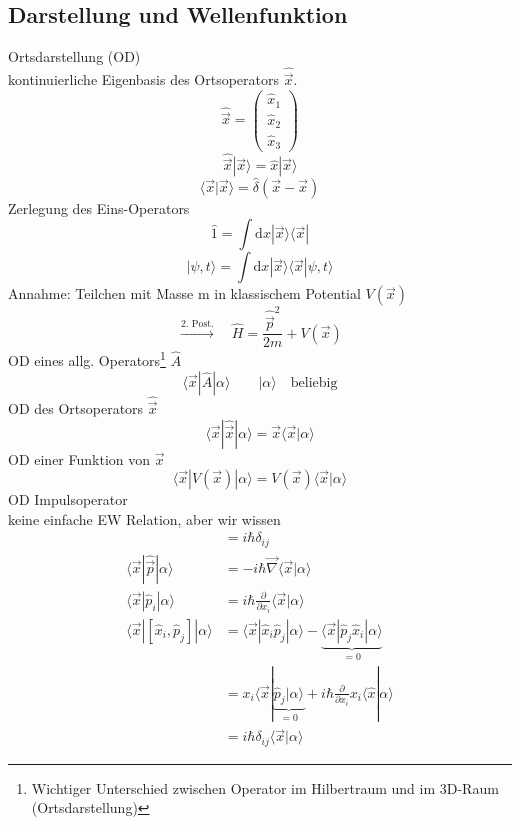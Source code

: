 \documentclass[10pt,article,colorback,accentcolor=tud9d]{scrartcl}
\begin{document}
\subsection{Darstellung und Wellenfunktion}
Ortsdarstellung (OD)\\
kontinuierliche Eigenbasis des Ortsoperators $\hat{\vec{x}}$.
$$
\hat{\vec{x}}=\left(\begin{array}{c} \hat{x}_1 \\ \hat{x}_2 \\ \hat{x}_3 \end{array}\right)
$$
$$
\hat{\vec{x}}|\vec{x}\rangle=\hat{x}|\vec{x}\rangle
$$
\begin{equation}
\langle\vec{x}|\vec{x}\rangle=\hat{\delta}(\vec{x}-\vec{x})
\end{equation}
Zerlegung des Eins-Operators
$$
\hat{1}=\int \text{d}x \left|\vec{x}\rangle\langle\vec{x}\right|
$$
\begin{equation}
|\psi,t\rangle=\int \text{d}x\left|\vec{x}\rangle\langle\vec{x}\right|\psi,t\rangle
\label{eq:WellenfunktionOrtsdarstellung}
\end{equation}
Annahme: Teilchen mit Masse m in klassischem Potential $V(\vec{x})$
\begin{equation}
\xrightarrow{\text{2. Post.}} \quad \hat{H}=\frac{\hat{\vec{p}}^2}{2m}+V(\vec{x})
\label{eq:Hamiltonoperator}
\end{equation}
OD eines allg. Operators\footnote{Wichtiger Unterschied zwischen Operator im Hilbertraum und im 3D-Raum (Ortsdarstellung)} $\hat{A}$
$$
\langle\vec{x}|\hat{A}|\alpha\rangle \quad \quad |\alpha\rangle \quad \text{beliebig}
$$
OD des Ortsoperators $\hat{\vec{x}}$
$$
\langle\vec{x}|\hat{\vec{x}}|\alpha\rangle=\vec{x}\langle\vec{x}|\alpha\rangle
$$
OD einer Funktion von $\vec{x}$
$$
\langle\vec{x}|V(\vec{x})|\alpha\rangle=V(\vec{x})\langle\vec{x}|\alpha\rangle
$$
OD Impulsoperator\\
keine einfache EW Relation, aber wir wissen
\begin{align}
  [\hat{x}_i,\hat{p}_j]&=i\hbar\delta_{ij} \\ 
  \langle\vec{x}|\hat{\vec{p}}|\alpha\rangle&=-i\hbar\vec{\nabla}\langle\vec{x}|\alpha\rangle\\ 
  \langle\vec{x}|\hat{p}_i|\alpha\rangle&=i\hbar\frac{\partial}{\partial x_i}\langle\vec{x}|\alpha\rangle\\
  \langle\vec{x}|[\hat{x}_i,\hat{p}_j]|\alpha\rangle&=\langle\vec{x}|\hat{x}_i\hat{p}_j|\alpha\rangle-\underbrace{\langle\vec{x}|\hat{p}_j\hat{x}_i|\alpha\rangle}_{=0}\\ 
  &=x_i\langle\vec{x}|\underbrace{\hat{p}_j|\alpha\rangle}_{=0}+i\hbar\frac{\partial}{\partial x_i}x_i\langle\hat{x}|\alpha\rangle\\
  &=i\hbar\delta_{ij}\langle\vec{x}|\alpha\rangle
\end{align}
\end{document}
